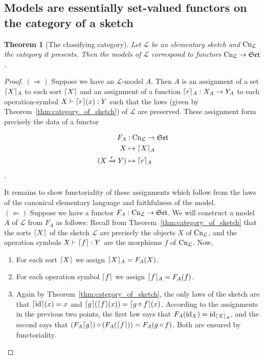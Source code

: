 \documentclass[12pt,twoside]{reedthesis}
\theoremstyle{definition}
\theoremstyle{remark}
\theoremstyle{plain}
\newtheorem{theorem}{Theorem}
\DeclarePairedDelimiter\ceil{\lceil}{\rceil}
\begin{document}
\subsection{Models are essentially set-valued functors on the category of a sketch}
\begin{theorem}[The classifying category]\label{thm:classify_elem_sketch}
  Let $\mathcal{L}$ be an elementary sketch and \( \mathrm{Cn}_{\mathcal{L}} \) the
  category it presents. Then the models of $\mathcal{L}$ correspond to functors
  $\mathrm{Cn}_{\mathcal{L}} \rightarrow \mathfrak{Set}$.
\end{theorem}
\begin{proof}
  \( (\Rightarrow) \) Suppose we have an \( \mathcal{L}\)-model $A$. Then $A$ is an
  assignment of a set $\ceil{X}_{A}$ to each sort \( \ceil{X}\) and an
  assignment of a function \( \ceil{r}_{A} : X_{A} \rightarrow Y_{A}\) to each operation-symbol
  \( X \vdash \ceil{r}(x) : Y\) such that the laws (given by
  Theorem~\ref{thm:category_of_sketch}) of \( \mathcal{L} \) are preserved. These
  assignment form precisely the data of a functor

  \begin{align*}
   F_{A} &: \cn_{\mathcal{L}} \rightarrow \mathfrak{Set} \\
    X &\mapsto \ceil{X}_{A} \\
    (X \xrightarrow{r} Y) &\mapsto \ceil{r}_{A}
  \end{align*}.

  It remains to show functoriality of these assignments which follow from the
  laws of the canonical elementary language and faithfulness of the model. \\

  \( (\Leftarrow) \) Suppose we have a functor
  $F_A : \mathrm{Cn}_{\mathcal{L}} \rightarrow \mathfrak{Set}$. We will construct a model $A$ of
  $\mathcal{L}$ from $F_{A}$ as follows: Recall from
  Theorem~\ref{thm:category_of_sketch} %
  that the sorts \(\ceil{X} \) of the sketch $\mathcal{L}$ are precisely the
  objects $X$ of \( \mathrm{Cn}_{ \mathcal{L}} \), and the operation symbols
  \( X \vdash \ceil{ f } : Y \) are the morphisms \( f \) of \( \mathrm{Cn}_{\mathcal{L}}\). Now,
  \begin{enumerate}
    \item For each sort \(\ceil{X}\) we assign \( \ceil{X}_A = F_{A}(X)\).
    \item For each operation symbol \( \ceil{f} \) we assign \( \ceil{f}_{A} = F_{A}(f) \).
    \item Again by Theorem~\ref{thm:category_of_sketch}, the only laws of the
          sketch are that \(\ceil{\text{id}}(x) = x\) and
          \(\ceil{g}(\ceil{f}(x)) = \ceil{g \circ f}(x)\). According to the
          assignments in the previous two points, the first law says that
          \(F_{A}(\text{id}_{X}) = \text{id}_{\ceil{X}_{A}}\), and the second says that
          \( (F_{A} \ceil{g}) \circ (F_{A}(\ceil{f})) = F_{A} (g \circ f)\). Both are
          ensured by functoriality.
  \end{enumerate}
\end{proof}
\end{document}
